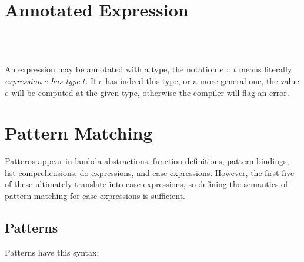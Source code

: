 \section{Annotated Expression} \label{annex}

\begin{flushleft}
  \sym{::}  \alt{} \\
  \alt{}  \alt{}  \alt{}  \alt{}  \\
\end{flushleft}

An expression may be annotated with a type, the notation $e$ :: $t$ means literally \emph{expression} $e$ \emph{has type} $t$. If $e$ has indeed this type, or a more general one, the value $e$ will be computed at the given type, otherwise the compiler will flag an error.



\section{Pattern Matching} \label{patternmatch}  

Patterns appear in lambda abstractions, function definitions, pattern bindings, list comprehensions, do expressions, and case expressions. However, the first five of these ultimately translate into case expressions, so defining the semantics of pattern matching for case expressions is sufficient.

\subsection{Patterns} \label{patterns} 

Patterns have this syntax:

